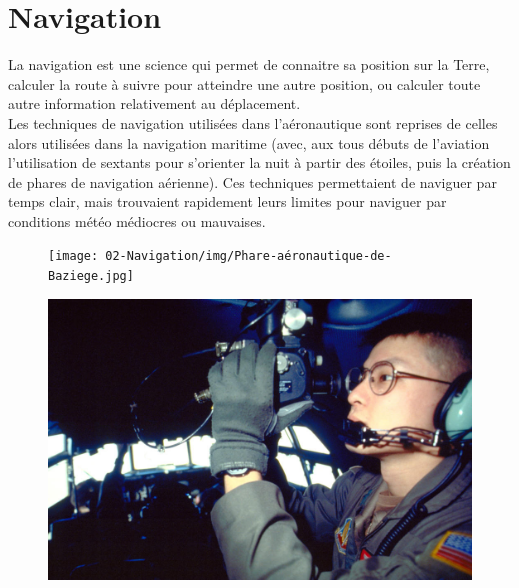 \section{Navigation}
	La navigation est une science qui permet de connaitre sa position sur la Terre, calculer la route à suivre pour atteindre une autre position, ou calculer toute autre information relativement au déplacement. \\

	Les techniques de navigation utilisées dans l'aéronautique sont reprises de celles alors utilisées dans la navigation maritime (avec, aux tous débuts de l'aviation l'utilisation de sextants pour s'orienter la nuit à partir des étoiles, puis la création de phares de navigation aérienne). Ces techniques permettaient de naviguer par temps clair, mais trouvaient rapidement leurs limites pour naviguer par conditions météo médiocres ou mauvaises.
	
	\begin{minipage}[c]{1.0\linewidth}
	\begin{figure}[H]
	\begin{minipage}[c]{0.4\linewidth}
	\centering
	\texttt{[image: 02-Navigation/img/Phare-aéronautique-de-Baziege.jpg]}
	\end{minipage}
	\begin{minipage}[c]{0.6\linewidth}
	\centering
	\includegraphics[width=0.95\linewidth]{02-Navigation/img/Sextant-C130.jpg}
	\end{minipage}
	\end{figure}
	\end{minipage}
	
